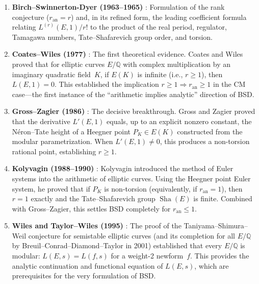 \documentclass[11pt]{article}
\DeclareMathOperator{\Sha}{Sha}
\begin{document}
\begin{enumerate}
  \item \textbf{Birch--Swinnerton-Dyer (1963--1965)} \cite{BSD, BSD-I}:
    Formulation of the rank conjecture ($r_{\mathrm{an}} = r$) and, in its
    refined form, the leading coefficient formula relating $L^{(r)}(E,1)/r!$
    to the product of the real period, regulator, Tamagawa numbers,
    Tate--Shafarevich group order, and torsion.

  \item \textbf{Coates--Wiles (1977)} \cite{CW}:
    The first theoretical evidence.  Coates and Wiles proved that for elliptic
    curves $E/\mathbb{Q}$ with complex multiplication by an imaginary quadratic
    field~$K$, if $E(K)$ is infinite (i.e., $r \geq 1$), then $L(E,1) = 0$.
    This established the implication $r \geq 1 \Rightarrow r_{\mathrm{an}}
    \geq 1$ in the CM case---the first instance of the ``arithmetic implies
    analytic'' direction of BSD.

  \item \textbf{Gross--Zagier (1986)} \cite{GZ}:
    The decisive breakthrough.  Gross and Zagier proved that the derivative
    $L'(E,1)$ equals, up to an explicit nonzero constant, the N\'eron--Tate
    height of a Heegner point $P_K \in E(K)$ constructed from the modular
    parametrization.  When $L'(E,1) \neq 0$, this produces a non-torsion
    rational point, establishing $r \geq 1$.

  \item \textbf{Kolyvagin (1988--1990)} \cite{Koly}:
    Kolyvagin introduced the method of Euler systems into the arithmetic of
    elliptic curves.  Using the Heegner point Euler system, he proved that if
    $P_K$ is non-torsion (equivalently, if $r_{\mathrm{an}} = 1$), then
    $r = 1$ exactly and the Tate--Shafarevich group $\Sha(E)$ is finite.
    Combined with Gross--Zagier, this settles BSD completely for
    $r_{\mathrm{an}} \leq 1$.

  \item \textbf{Wiles and Taylor--Wiles (1995)} \cite{Wiles, TW}:
    The proof of the Taniyama--Shimura--Weil conjecture for semistable elliptic
    curves (and its completion for all $E/\mathbb{Q}$ by Breuil--Conrad--Diamond--Taylor
    \cite{BCDT} in 2001) established that every $E/\mathbb{Q}$ is modular:
    $L(E,s) = L(f,s)$ for a weight-2 newform~$f$.  This provides the analytic
    continuation and functional equation of $L(E,s)$, which are prerequisites
    for the very formulation of BSD.


\end{enumerate}
\end{document}
